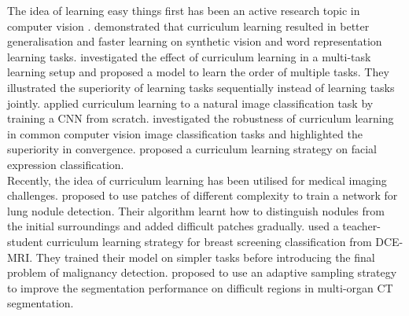 \documentclass[preprint,12pt,authoryear]{elsarticle}
\begin{document}
The idea of learning easy things first has been an active research topic in computer vision \citep{Lee2011}. \cite{Bengio2009} demonstrated that curriculum learning resulted in better generalisation and faster learning on synthetic vision and word representation  learning  tasks.  \cite{Pentina2015}  investigated the  effect  of  curriculum  learning  in a multi-task learning setup and proposed a model to learn the order of multiple tasks. They illustrated the superiority of learning tasks sequentially instead of learning tasks jointly. \cite{Avramova2015} applied curriculum learning to a natural image classification task by training a CNN from scratch. \cite{Weinshall2018} investigated the robustness of curriculum learning in common computer vision image classification tasks and highlighted the superiority in convergence. \cite{Gui2017} proposed a curriculum learning strategy on facial expression classification.\\


Recently, the idea of curriculum learning has been utilised for medical imaging challenges. \cite{Jesson2017} proposed to use patches of different complexity to train a network for lung nodule detection. Their algorithm learnt how to distinguish nodules from the initial surroundings and added difficult patches gradually.
\cite{Maicas2018} used a teacher-student curriculum learning strategy for breast screening classification from DCE-MRI. They trained their model on simpler tasks before introducing the final problem of malignancy detection. 
\cite{Berger2018} proposed to use an adaptive sampling strategy to improve the segmentation performance on difficult regions in multi-organ CT segmentation.
\end{document}

